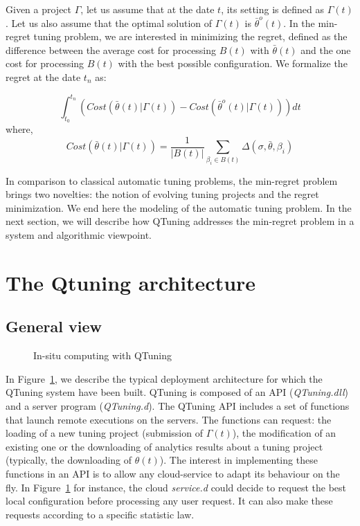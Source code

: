 \documentclass[10pt, conference, compsocconf]{IEEEtran}
\begin{document}
Given a project $\Gamma$, let us assume that at the date $t$, its setting is defined as $\Gamma(t)$. 
Let us also assume that the optimal solution of $\Gamma(t)$ is $\bar{\theta}^o(t)$. 
In the min-regret tuning problem, we are interested in minimizing the regret, defined as the 
difference between the average cost for processing $B(t)$ with $\bar{\theta}(t)$ and the one cost for 
processing $B(t)$ with the best possible configuration. We formalize the regret at the date $t_n$ as: 

\[
\int_{t_0}^{t_n} \left( Cost(\bar{\theta}(t)| \Gamma(t)) - Cost(\bar{\theta}^o(t) | \Gamma(t)) \right) dt
\]
where, 
\[
Cost(\bar{\theta}(t) | \Gamma(t)) = \frac{1}{|B(t)|}\sum_{\beta_i \in B(t)} \Delta(\sigma, \bar{\theta}, \beta_i) 
\]


In comparison to classical automatic tuning problems, the min-regret problem brings two novelties: 
the notion of evolving tuning projects and the regret minimization. 
We end here the modeling of the automatic tuning problem. In the next section, we will describe how 
QTuning addresses the min-regret problem in a system and algorithmic viewpoint.

\section{The Qtuning architecture} \label{Architecture}

\subsection{General view}

	\begin{figure}[hbtp]
	\begin{center}
	
	\caption{In-situ computing with QTuning}
	\label{fig:QTuning}
	\end{center}
	\end{figure}


In Figure~\ref{fig:QTuning}, we describe the typical deployment architecture for which the 
QTuning system have been built. QTuning is composed of an API ({\it QTuning.dll}) and 
a server program ({\it QTuning.d}). The QTuning API includes a set of functions that 
launch remote executions on the servers. The functions can request: the loading of a new tuning project (submission of 
$\Gamma(t)$), the modification of an existing one or the downloading of analytics results about a tuning project 
(typically, the downloading of $\theta(t)$). The interest in implementing these functions in an API is 
to allow any cloud-service to adapt its behaviour on the fly. In Figure~\ref{fig:QTuning} for instance,  
the cloud {\it service.d} could decide to request the best local configuration before processing any user request. 
It can also make these requests according to a specific statistic law.
\end{document}
